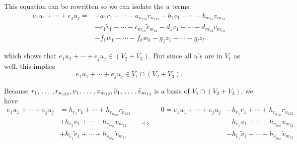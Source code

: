 \begin{xrcs}
%
This equation can be rewritten so we can isolate the $u$ terms:
\[
\begin{aligned}
  e_{1} u_1 + \cdots + e_j u_j = &- a_1r_1 -  \cdots - a_{n_{123}} r_{n_{123}} - b_1v_1 -  \cdots - b_{m_{12}} v_{m_{12}} \\
  &-  c_1\widetilde{v}_1 - \cdots - c_{m_{13}}\widetilde{v}_{m_{13}} - d_{1}\overline{v}_1 - \cdots - d_{m_{23}}\overline{v}_{m_{23}} \\
  &  - f_1 w_1 - \cdots - f_k w_k - g_1 z_1 - \cdots - g_l z_l
\end{aligned}
\]

which shows that $e_{1} u_1 + \cdots + e_j u_j \in (V_2 + V_3)$. But since all $u$'s are in $V_1$ as well, this implies
\[ e_{1} u_1 + \cdots + e_j u_j \in V_1 \cap (V_2 + V_3).\]


Because $r_{1}, {\, \ldots \,\,}, r_{n_{123}}, v_{1}, {\, \ldots \,\,}, v_{m_{12}}, \widetilde{v}_1, {\, \ldots \,\,}, \widetilde{v}_{m_{13}}$ is a basis of $V_1 \cap (V_2+V_3)$, we have
\begin{equation}
  \label{eq: equation for u}
  \begin{aligned}
  e_{1} u_1 + \cdots + e_j u_j &= h_{r_{1}} r_{1} + \cdots + h_{r_{n_{123}}} r_{n_{123}} \\
  &  + h_{v_{1}} v_{1} + \cdots + h_{v_{m_{12}}} v_{m_{12}} \\
  &  + h_{\widetilde{v}_1} \widetilde{v}_1 + \cdots + h_{\widetilde{v}_{m_{13}}} \widetilde{v}_{m_{13}}
  \end{aligned}
  \quad \iff \quad
  \begin{aligned}
  0 = e_{1} u_1 + \cdots + e_j u_j &- h_{r_{1}} r_{1} + \cdots + h_{r_{n_{123}}} r_{n_{123}} \\
  &  - h_{v_{1}} v_{1} + \cdots + h_{v_{m_{12}}} v_{m_{12}} \\
  &  - h_{\widetilde{v}_1} \widetilde{v}_1 + \cdots + h_{\widetilde{v}_{m_{13}}} \widetilde{v}_{m_{13}}
  \end{aligned}
\end{equation}


\end{xrcs}
